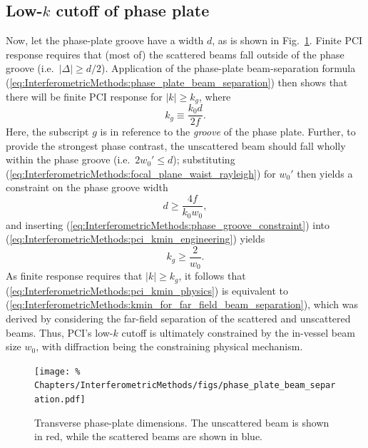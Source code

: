 \subsection{Low-$k$ cutoff of phase plate}
Now, let the phase-plate groove have a width $d$, as is shown in
Fig.~\ref{fig:InterferometricMethods:phase_plate_beam_separation}.
Finite PCI response requires that (most of) the scattered beams
fall outside of the phase groove (i.e.\ $|\Delta| \geq d / 2$).
Application of the phase-plate beam-separation formula
(\ref{eq:InterferometricMethods:phase_plate_beam_separation})
then shows that there will be finite PCI response
for $|k| \geq k_g$, where
\begin{equation}
  k_g \equiv \frac{k_0 d}{2 f}.
  \label{eq:InterferometricMethods:pci_kmin_engineering}
\end{equation}
Here, the subscript $g$ is in reference
to the \emph{groove} of the phase plate.
Further, to provide the strongest phase contrast,
the unscattered beam should fall wholly within the phase groove
(i.e.\ $2 w_0' \leq d$);
substituting (\ref{eq:InterferometricMethods:focal_plane_waist_rayleigh})
for $w_0'$ then yields a constraint on the phase groove width
\begin{equation}
  d \geq \frac{4 f}{k_0 w_0},
  \label{eq:InterferometricMethods:phase_groove_constraint}
\end{equation}
and inserting (\ref{eq:InterferometricMethods:phase_groove_constraint}) into
(\ref{eq:InterferometricMethods:pci_kmin_engineering}) yields
\begin{equation}
  k_g \geq \frac{2}{w_0}.
  \label{eq:InterferometricMethods:pci_kmin_physics}
\end{equation}
As finite response requires that $|k| \geq k_g$, it follows that
(\ref{eq:InterferometricMethods:pci_kmin_physics}) is equivalent to
(\ref{eq:InterferometricMethods:kmin_for_far_field_beam_separation}),
which was derived by considering the far-field separation
of the scattered and unscattered beams.
Thus, PCI's low-$k$ cutoff
is ultimately constrained by the in-vessel beam size $w_0$,
with diffraction being the constraining physical mechanism.

\begin{figure}
  \centering
  \texttt{[image: \%
    Chapters/InterferometricMethods/figs/phase\_plate\_beam\_separation.pdf]}
  \caption[Transverse phase-plate dimensions]{%
    Transverse phase-plate dimensions.
    The unscattered beam is shown in red, while
    the scattered beams are shown in blue.}
  \label{fig:InterferometricMethods:phase_plate_beam_separation}
\end{figure}


